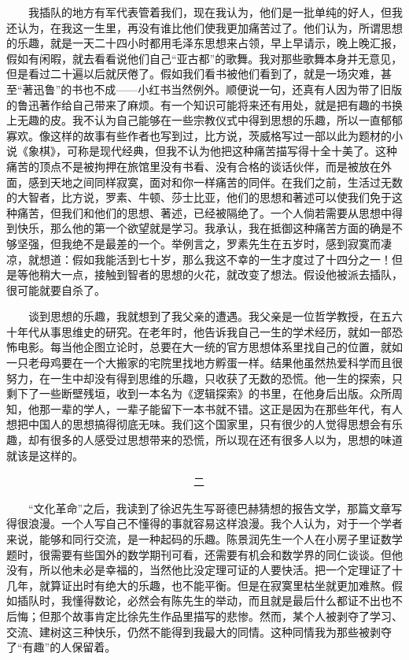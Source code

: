 　　我插队的地方有军代表管着我们，现在我认为，他们是一批单纯的好人，但我还认为，在我这一生里，再没有谁比他们使我更加痛苦过了。他们认为，所谓思想的乐趣，就是一天二十四小时都用毛泽东思想来占领，早上早请示，晚上晚汇报，假如有闲暇，就去看看说他们自己“亚古都”的歌舞。我对那些歌舞本身并无意见，但是看过二十遍以后就厌倦了。假如我们看书被他们看到了，就是一场灾难，甚至“著迅鲁”的书也不成——小红书当然例外。顺便说一句，还真有人因为带了旧版的鲁迅著作给自己带来了麻烦。有一个知识可能将来还有用处，就是把有趣的书换上无趣的皮。我不认为自己能够在一些宗教仪式中得到思想的乐趣，所以一直郁郁寡欢。像这样的故事有些作者也写到过，比方说，茨威格写过一部以此为题材的小说《象棋》，可称是现代经典，但我不认为他把这种痛苦描写得十全十美了。这种痛苦的顶点不是被拘押在旅馆里没有书看、没有合格的谈话伙伴，而是被放在外面，感到天地之间同样寂寞，面对和你一样痛苦的同伴。在我们之前，生活过无数的大智者，比方说，罗素、牛顿、莎士比亚，他们的思想和著述可以使我们免于这种痛苦，但我们和他们的思想、著述，已经被隔绝了。一个人倘若需要从思想中得到快乐，那么他的第一个欲望就是学习。我承认，我在抵御这种痛苦方面的确是不够坚强，但我绝不是最差的一个。举例言之，罗素先生在五岁时，感到寂寞而凄凉，就想道：假如我能活到七十岁，那么我这不幸的一生才度过了十四分之一！但是等他稍大一点，接触到智者的思想的火花，就改变了想法。假设他被派去插队，很可能就要自杀了。 

　　谈到思想的乐趣，我就想到了我父亲的遭遇。我父亲是一位哲学教授，在五六十年代从事思维史的研究。在老年时，他告诉我自己一生的学术经历，就如一部恐怖电影。每当他企图立论时，总要在大一统的官方思想体系里找自己的位置，就如一只老母鸡要在一个大搬家的宅院里找地方孵蛋一样。结果他虽然热爱科学而且很努力，在一生中却没有得到思维的乐趣，只收获了无数的恐慌。他一生的探索，只剩下了一些断壁残垣，收到一本名为《逻辑探索》的书里，在他身后出版。众所周知，他那一辈的学人，一辈子能留下一本书就不错。这正是因为在那些年代，有人想把中国人的思想搞得彻底无味。我们这个国家里，只有很少的人觉得思想会有乐趣，却有很多的人感受过思想带来的恐慌，所以现在还有很多人以为，思想的味道就该是这样的。 


　　　　　　　　　　　　　　　　　二 

　　“文化革命”之后，我读到了徐迟先生写哥德巴赫猜想的报告文学，那篇文章写得很浪漫。一个人写自己不懂得的事就容易这样浪漫。我个人认为，对于一个学者来说，能够和同行交流，是一种起码的乐趣。陈景润先生一个人在小房子里证数学题时，很需要有些国外的数学期刊可看，还需要有机会和数学界的同仁谈谈。但他没有，所以他未必是幸福的，当然他比没定理可证的人要快活。把一个定理证了十几年，就算证出时有绝大的乐趣，也不能平衡。但是在寂寞里枯坐就更加难熬。假如插队时，我懂得数论，必然会有陈先生的举动，而且就是最后什么都证不出也不后悔；但那个故事肯定比徐先生作品里描写的悲惨。然而，某个人被剥夺了学习、交流、建树这三种快乐，仍然不能得到我最大的同情。这种同情我为那些被剥夺了“有趣”的人保留着。 

